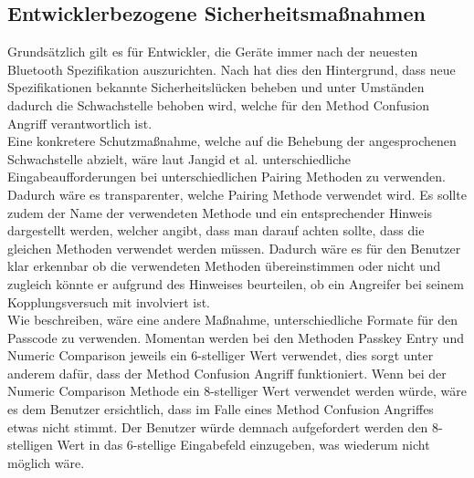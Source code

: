 \documentclass[
    a4paper,
    pagesize,
    pdftex,
    12pt,
]{scrartcl}
\begin{document}
\subsection{Entwicklerbezogene Sicherheitsmaßnahmen}
    Grundsätzlich gilt es für Entwickler, die Geräte immer nach der neuesten Bluetooth Spezifikation auszurichten. Nach \cite{bluetooth_newest_security_risks} hat dies den Hintergrund, dass neue Spezifikationen bekannte Sicherheitslücken beheben und unter Umständen dadurch die Schwachstelle behoben wird, welche für den Method Confusion Angriff verantwortlich ist. \\
    Eine konkretere Schutzmaßnahme, welche auf die Behebung der angesprochenen Schwachstelle abzielt, wäre laut Jangid et al. \cite{bluetooth_formal_analysis} unterschiedliche Eingabeaufforderungen bei unterschiedlichen Pairing Methoden zu verwenden. Dadurch wäre es transparenter, welche Pairing Methode verwendet wird. Es sollte zudem der Name der verwendeten Methode und ein entsprechender Hinweis dargestellt werden, welcher angibt, dass man darauf achten sollte, dass die gleichen Methoden verwendet werden müssen. Dadurch wäre es für den Benutzer klar erkennbar ob die verwendeten Methoden übereinstimmen oder nicht und zugleich könnte er aufgrund des Hinweises beurteilen, ob ein Angreifer bei seinem Kopplungsversuch mit involviert ist. \\
    Wie \cite{bluetooth_formal_analysis} beschreiben, wäre eine andere Maßnahme, unterschiedliche Formate für den Passcode zu verwenden. Momentan werden bei den Methoden Passkey Entry und Numeric Comparison jeweils ein 6-stelliger Wert verwendet, dies sorgt unter anderem dafür, dass der Method Confusion Angriff funktioniert. Wenn bei der Numeric Comparison Methode ein 8-stelliger Wert verwendet werden würde, wäre es dem Benutzer ersichtlich, dass im Falle eines Method Confusion Angriffes etwas nicht stimmt. Der Benutzer würde demnach aufgefordert werden den 8-stelligen Wert in das 6-stellige Eingabefeld einzugeben, was wiederum nicht möglich wäre.
    
    \newpage
\end{document}
